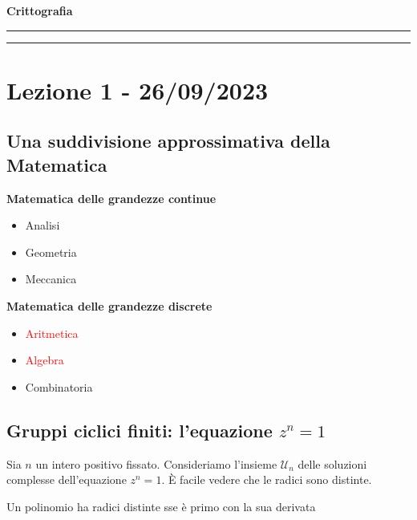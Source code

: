 \documentclass[11pt]{article}
\newcommand{\calU}{\mathcal{U}}
\begin{document}
\begin{center}
    \LARGE \textbf{Crittografia}
\end{center}

\vspace{0.5cm}
\hrule
\vspace{0.5cm}

\tableofcontents

\vspace{0.5cm}
\hrule
\vspace{0.5cm}

\section{Lezione 1 - 26/09/2023}

\subsection{Una suddivisione approssimativa della Matematica}

    \begin{multicols}{2}
    \textbf{Matematica delle grandezze continue}
    \begin{itemize}
        \item Analisi
        \item Geometria  
        \item Meccanica
    \end{itemize}
    
    \columnbreak
    
    \textbf{Matematica delle grandezze discrete}
    \begin{itemize}
        \item \textcolor{red}{Aritmetica}
        \item \textcolor{red}{Algebra}
        \item Combinatoria
    \end{itemize}
    \end{multicols}
    
\subsection{Gruppi ciclici finiti: l'equazione $z^n = 1$}
    Sia $n$ un intero positivo fissato. Consideriamo l'insieme $\calU_n$ delle soluzioni complesse dell'equazione $z^n = 1$. È facile vedere che le radici sono distinte.
    
    \begin{theorem}{}{}
        Un polinomio ha radici distinte sse è primo con la sua derivata
    \end{theorem}
    
\end{document}
